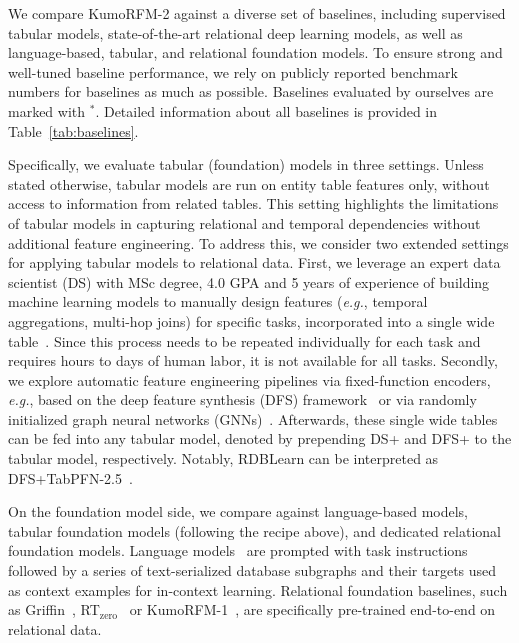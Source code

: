 \documentclass{article}
\newcommand{\onezero}{1\xspace}
\newcommand{\twozero}{2\xspace}
\newcommand{\name}{KumoRFM\xspace}
\newcommand{\nameone}{\name-\onezero}
\newcommand{\nametwo}{\name-\twozero}
\begin{document}
We compare \nametwo against a diverse set of baselines, including supervised tabular models, state-of-the-art relational deep learning models, as well as language-based, tabular, and relational foundation models.
To ensure strong and well-tuned baseline performance, we rely on publicly reported benchmark numbers for baselines as much as possible.
Baselines evaluated by ourselves are marked with $^*$.
Detailed information about all baselines is provided in Table~\ref{tab:baselines}.

Specifically, we evaluate tabular (foundation) models in three settings.
Unless stated otherwise, tabular models are run on entity table features only, without access to information from related tables.
This setting highlights the limitations of tabular models in capturing relational and temporal dependencies without additional feature engineering.
To address this, we consider two extended settings for applying tabular models to relational data.
First, we leverage an expert data scientist (DS) with MSc degree, 4.0 GPA and 5 years of experience of building machine learning models to manually design features (\emph{e.g.}, temporal aggregations, multi-hop joins) for specific tasks, incorporated into a single wide table~\citep{relbench}.
Since this process needs to be repeated individually for each task and requires hours to days of human labor, it is not available for all tasks.
Secondly, we explore automatic feature engineering pipelines via fixed-function encoders, \emph{e.g.}, based on the deep feature synthesis (DFS) framework~\citep{kanter2015deep} or via randomly initialized graph neural networks (GNNs)~\citep{gnntabpfn}.
Afterwards, these single wide tables can be fed into any tabular model, denoted by prepending DS+ and DFS+ to the tabular model, respectively. Notably, RDBLearn can be interpreted as DFS+TabPFN-2.5~\citep{xu2026rdblearn}.

On the foundation model side, we compare against language-based models, tabular foundation models (following the recipe above), and dedicated relational foundation models.
Language models~\citep{relllm,ranjan2026rt} are prompted with task instructions followed by a series of text-serialized database subgraphs and their targets used as context examples for in-context learning.
Relational foundation baselines, such as Griffin~\citep{griffin}, RT$_{\textrm{zero}}$~\citep{ranjan2026rt} or \nameone~\citep{fey2025kumorfm}, are specifically pre-trained end-to-end on relational data.
\end{document}
